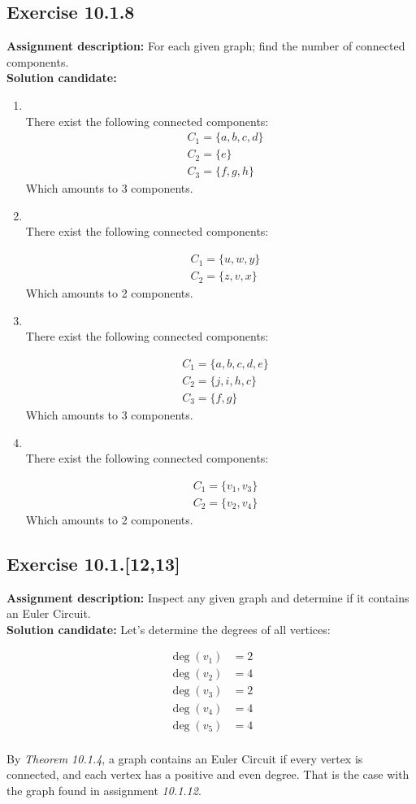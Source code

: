 \documentclass{report}
\newcommand{\mAlign}[1]{\begin{align*}#1\end{align*}}
\newcommand{\AssignmentDescription}{\textbf{Assignment description: }}
\newcommand{\Solution}{\textbf{Solution candidate: }}
\newcommand{\Exercise}[1]{\subsection{Exercise #1}}
\newcommand{\defaultEnumerateLabel}{\textbf{\alph*.}}
\newcommand{\emptyItem}{\item \,\\}
\begin{document}
	\Exercise{10.1.8}
	
	\AssignmentDescription
	For each given graph; find the number of connected components.\\
	
	\Solution
	\begin{enumerate}[label=\defaultEnumerateLabel]
		\emptyItem
		There exist the following connected components:
		\mAlign{&C_1 = \{a,b,c,d\}\\
					   &C_2 = \{e\} \\
				   	   &C_3=\{f,g,h\}}
  	   Which amounts to 3 components.
  	   
  	   \emptyItem
  	   There exist the following connected components:
  	   
  	   \mAlign{&C_1 = \{u,w,y\}\\
  	   	  			 &C_2 = \{z,v,x\}}
  	   Which amounts to 2 components.
		
		\emptyItem
		There exist the following connected components:
		
		\mAlign{&C_1 = \{a,b,c,d,e\}\\
			&C_2 = \{j,i,h,c\}\\
			&C_3 = \{f,g\}}
		Which amounts to 3 components.
		
		\emptyItem
		There exist the following connected components:
		
		\mAlign{&C_1 = \{v_1,v_3\}\\
			&C_2 = \{v_2,v_4\}}
		Which amounts to 2 components.
	\end{enumerate}
	
	\Exercise{10.1.[12,13]}
	
	\AssignmentDescription
	Inspect any given graph and determine if it contains an Euler Circuit.\\
	
	\Solution
	Let's determine the degrees of all vertices:
	
	\mAlign{\deg(v_1) &= 2 \\
				 \deg(v_2) &= 4 \\
		 		 \deg(v_3) &= 2 \\
		 		 \deg(v_4) &= 4 \\
		 		 \deg(v_5) &= 4 \\}
	 
	By \textit{Theorem 10.1.4}, a graph contains an Euler Circuit if every vertex is connected, and each vertex has a positive and even degree. That is the case with the graph found in assignment \textit{10.1.12}.\\
	
\end{document}
